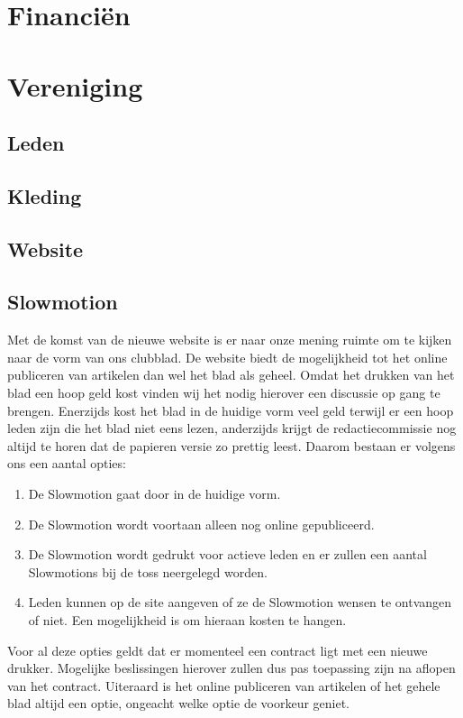 \documentclass[]{article}
\begin{document}
\section{Financi\"en}


\section{Vereniging}
\subsection{Leden}

\subsection{Kleding}

\subsection{Website}

\subsection{Slowmotion}
Met de komst van de nieuwe website is er naar onze mening ruimte om te kijken naar de vorm van ons clubblad. De website biedt de mogelijkheid tot het online publiceren van artikelen dan wel het blad als geheel. Omdat het drukken van het blad een hoop geld kost vinden wij het nodig hierover een discussie op gang te brengen. Enerzijds kost het blad in de huidige vorm veel geld terwijl er een hoop leden zijn die het blad niet eens lezen, anderzijds krijgt de redactiecommissie nog altijd te horen dat de papieren versie zo prettig leest. Daarom bestaan er volgens ons een aantal opties:
\begin{enumerate}
	\item
	De Slowmotion gaat door in de huidige vorm.
	\item
	De Slowmotion wordt voortaan alleen nog online gepubliceerd.
	\item
	De Slowmotion wordt gedrukt voor actieve leden en er zullen een aantal Slowmotions bij de toss neergelegd worden.
	\item
	Leden kunnen op de site aangeven of ze de Slowmotion wensen te ontvangen of niet. Een mogelijkheid is om hieraan kosten te hangen.
\end{enumerate}
Voor al deze opties geldt dat er momenteel een contract ligt met een nieuwe drukker. Mogelijke beslissingen hierover zullen dus pas toepassing zijn na aflopen van het contract. Uiteraard is het online publiceren van artikelen of het gehele blad altijd een optie, ongeacht welke optie de voorkeur geniet.
\end{document}
